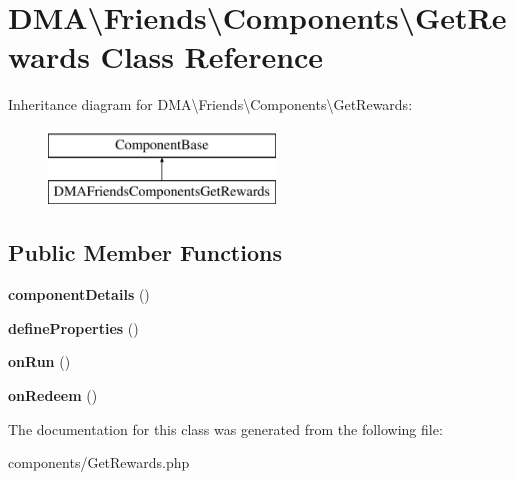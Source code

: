 \hypertarget{classDMA_1_1Friends_1_1Components_1_1GetRewards}{\section{D\+M\+A\textbackslash{}Friends\textbackslash{}Components\textbackslash{}Get\+Rewards Class Reference}
\label{classDMA_1_1Friends_1_1Components_1_1GetRewards}
}
Inheritance diagram for D\+M\+A\textbackslash{}Friends\textbackslash{}Components\textbackslash{}Get\+Rewards\+:\begin{figure}[H]
\begin{center}
\leavevmode
\includegraphics[height=2.000000cm]{d7/de7/classDMA_1_1Friends_1_1Components_1_1GetRewards}
\end{center}
\end{figure}
\subsection*{Public Member Functions}
\begin{DoxyCompactItemize}
\item 
\hypertarget{classDMA_1_1Friends_1_1Components_1_1GetRewards_ade8efd6ec6ab8eabcc99fc102a8bb13f}{{\bfseries component\+Details} ()}\label{classDMA_1_1Friends_1_1Components_1_1GetRewards_ade8efd6ec6ab8eabcc99fc102a8bb13f}

\item 
\hypertarget{classDMA_1_1Friends_1_1Components_1_1GetRewards_a74220ab9e695cfeae6d2443a5bb5cdd0}{{\bfseries define\+Properties} ()}\label{classDMA_1_1Friends_1_1Components_1_1GetRewards_a74220ab9e695cfeae6d2443a5bb5cdd0}

\item 
\hypertarget{classDMA_1_1Friends_1_1Components_1_1GetRewards_a4d4d20f4b87c5f3ffc0e448dc349c0ce}{{\bfseries on\+Run} ()}\label{classDMA_1_1Friends_1_1Components_1_1GetRewards_a4d4d20f4b87c5f3ffc0e448dc349c0ce}

\item 
\hypertarget{classDMA_1_1Friends_1_1Components_1_1GetRewards_ae6fdcdd1ef7c47b26cb20f36512e73ae}{{\bfseries on\+Redeem} ()}\label{classDMA_1_1Friends_1_1Components_1_1GetRewards_ae6fdcdd1ef7c47b26cb20f36512e73ae}

\end{DoxyCompactItemize}


The documentation for this class was generated from the following file\+:\begin{DoxyCompactItemize}
\item 
components/Get\+Rewards.\+php\end{DoxyCompactItemize}
